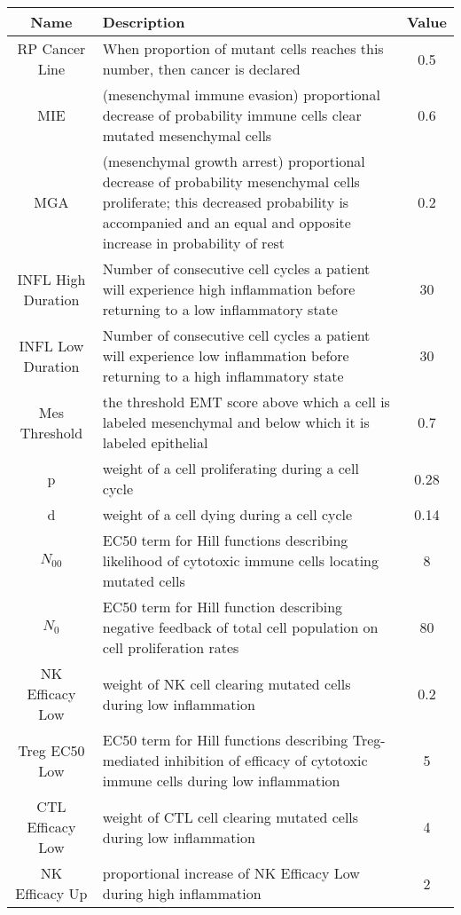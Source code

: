 \documentclass[11pt, a4paper, preprint]{article}
\begin{document}
\begin{center}
 \begin{longtable}{||c | p{10cm} | c||} 
 \hline
 Name & Description & Value  \\ [0.5ex] 
 \hline\hline
 RP Cancer Line & When proportion of mutant cells reaches this number, then cancer is declared & 0.5  \\ 
 \hline
 MIE & (mesenchymal immune evasion) proportional decrease of probability immune cells clear mutated mesenchymal cells & 0.6  \\
 \hline
 MGA & (mesenchymal growth arrest) proportional decrease of probability mesenchymal cells proliferate; this decreased probability is accompanied and an equal and opposite increase in probability of rest & 0.2  \\
 \hline
 INFL High Duration & Number of consecutive cell cycles a patient will experience high inflammation before returning to a low inflammatory state & 30  \\
 \hline
INFL Low Duration & Number of consecutive cell cycles a patient will experience low inflammation before returning to a high inflammatory state & 30  \\
 \hline
Mes Threshold & the threshold EMT score above which a cell is labeled mesenchymal and below which it is labeled epithelial & 0.7 \\
 \hline
 p & weight of a cell proliferating during a cell cycle & 0.28 \\ 
 \hline
 d & weight of a cell dying during a cell cycle & 0.14 \\
 \hline
 $N_{00}$ & EC50 term for Hill functions describing likelihood of cytotoxic immune cells locating mutated cells & 8\\
 \hline
 $N_0$ & EC50 term for Hill function describing negative feedback of total cell population on cell proliferation rates & 80 \\
 \hline
  NK Efficacy Low & weight of NK cell clearing mutated cells during low inflammation & 0.2 \\
  \hline
  Treg EC50 Low & EC50 term for Hill functions describing Treg-mediated inhibition of efficacy of cytotoxic immune cells during low inflammation & 5 \\
  \hline
  CTL Efficacy Low & weight of CTL cell clearing mutated cells during low inflammation & 4 \\
  \hline
  NK Efficacy Up & proportional increase of NK Efficacy Low during high inflammation & 2 \\
  \hline

\end{longtable}
\end{center}
\end{document}
